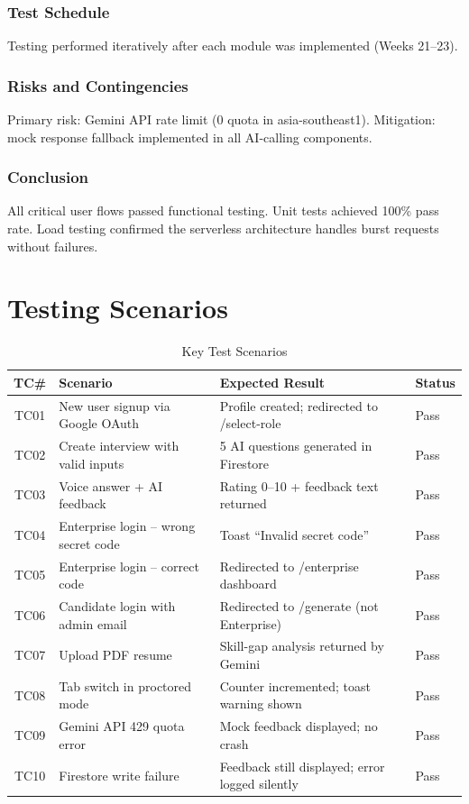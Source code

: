 \documentclass{fisatprojectfinal}
\begin{document}
\subsubsection*{Test Schedule}
Testing performed iteratively after each module was implemented (Weeks 21--23).

\subsubsection*{Risks and Contingencies}
Primary risk: Gemini API rate limit (0 quota in asia-southeast1). Mitigation: mock response
fallback implemented in all AI-calling components.

\subsubsection*{Conclusion}
All critical user flows passed functional testing. Unit tests achieved 100\% pass rate. Load
testing confirmed the serverless architecture handles burst requests without failures.

\section{Testing Scenarios}

\begin{table}[h!]
\centering
\caption{Key Test Scenarios}
\begin{tabular}{|c|p{4.5cm}|p{3.8cm}|p{2cm}|}
\hline
\textbf{TC\#} & \textbf{Scenario} & \textbf{Expected Result} & \textbf{Status} \\
\hline
TC01 & New user signup via Google OAuth & Profile created; redirected to /select-role & Pass \\
\hline
TC02 & Create interview with valid inputs & 5 AI questions generated in Firestore & Pass \\
\hline
TC03 & Voice answer + AI feedback & Rating 0--10 + feedback text returned & Pass \\
\hline
TC04 & Enterprise login -- wrong secret code & Toast ``Invalid secret code'' & Pass \\
\hline
TC05 & Enterprise login -- correct code & Redirected to /enterprise dashboard & Pass \\
\hline
TC06 & Candidate login with admin email & Redirected to /generate (not Enterprise) & Pass \\
\hline
TC07 & Upload PDF resume & Skill-gap analysis returned by Gemini & Pass \\
\hline
TC08 & Tab switch in proctored mode & Counter incremented; toast warning shown & Pass \\
\hline
TC09 & Gemini API 429 quota error & Mock feedback displayed; no crash & Pass \\
\hline
TC10 & Firestore write failure & Feedback still displayed; error logged silently & Pass \\
\hline
\end{tabular}
\end{table}
\end{document}
